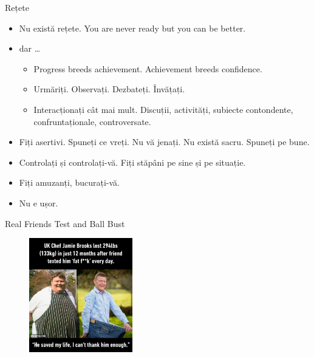\documentclass{simple}
\begin{document}
\begin{frame}{Rețete}
  \begin{itemize}
    \pause
    \item Nu există rețete. You are never ready but you can be better.
    \pause
    \item dar \ldots
      \begin{itemize}
        \pause
        \item Progress breeds achievement. Achievement breeds confidence.
        \pause
        \item Urmăriți. Observați. Dezbateți. Învățați.
        \pause
        \item Interacționați cât mai mult. Discuții, activități, subiecte contondente, confruntaționale, controversate.
      \end{itemize}
    \pause
    \item Fiți asertivi. Spuneți ce vreți. Nu vă jenați. Nu există sacru. Spuneți pe bune.
    \pause
    \item Controlați și controlați-vă. Fiți stăpâni pe sine și pe situație.
    \pause
    \item Fiți amuzanți, bucurați-vă.
    \pause
    \item Nu e ușor.
  \end{itemize}
\end{frame}

\begin{frame}{Real Friends Test and Ball Bust}
  \begin{figure}
    \centering
    \includegraphics[width=0.4\textwidth]{img/getting-nasty-feedback.jpg}
  \end{figure}
\end{frame}
\end{document}

